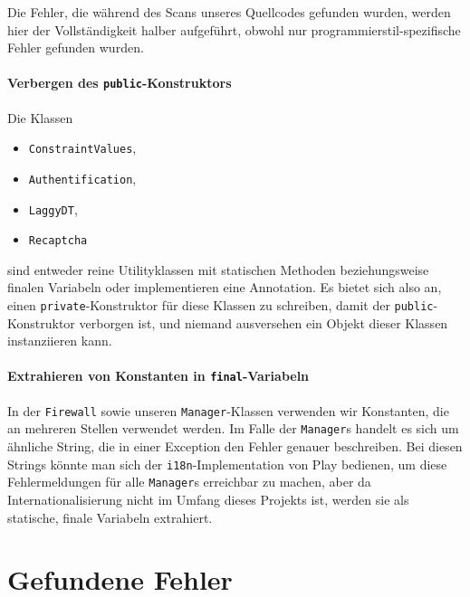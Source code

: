 \documentclass[12pt,DIV14,BCOR10mm,a4paper,parskip=half-,headsepline,headinclude,english,ngerman,bibliography=totocnumbered]{scrreprt}
\begin{document}
Die Fehler, die während des Scans unseres Quellcodes gefunden wurden, werden hier der Vollständigkeit halber aufgeführt, obwohl nur programmierstil-spezifische Fehler gefunden wurden.

\subsubsection{Verbergen des \texttt{public}-Konstruktors}

Die Klassen

\begin{itemize}
  \item \texttt{ConstraintValues},
  \item \texttt{Authentification},
  \item \texttt{LaggyDT},
  \item \texttt{Recaptcha}
\end{itemize}

sind entweder reine Utilityklassen mit statischen Methoden beziehungsweise finalen Variabeln oder implementieren eine Annotation.
Es bietet sich also an, einen \texttt{private}-Konstruktor für diese Klassen zu schreiben, damit der \texttt{public}-Konstruktor verborgen ist, und niemand ausversehen ein Objekt dieser Klassen instanziieren kann.

\subsubsection{Extrahieren von Konstanten in \texttt{final}-Variabeln}

In der \texttt{Firewall} sowie unseren \texttt{Manager}-Klassen verwenden wir Konstanten, die an mehreren Stellen verwendet werden.
Im Falle der \texttt{Manager}s handelt es sich um ähnliche String, die in einer Exception den Fehler genauer beschreiben.
Bei diesen Strings könnte man sich der \texttt{i18n}-Implementation von Play bedienen, um diese Fehlermeldungen für alle \texttt{Manager}s erreichbar zu machen, aber da Internationalisierung nicht im Umfang dieses Projekts ist, werden sie als statische, finale Variabeln extrahiert.



\chapter{Gefundene Fehler}
\end{document}
